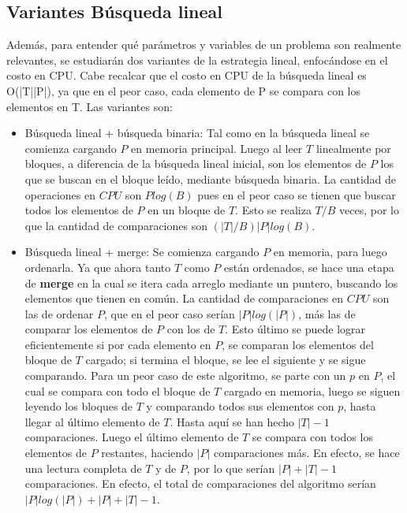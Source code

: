 \documentclass[11pt]{article}
\begin{document}
\subsection{Variantes Búsqueda lineal}
Además, para entender qué parámetros y variables de un problema son realmente relevantes, se estudiarán dos variantes de la estrategia lineal, enfocándose en el costo en CPU. Cabe recalcar que el costo en CPU de la búsqueda lineal es O(|T||P|), ya que en el peor caso, cada elemento de P se compara con los elementos en T. Las variantes son:
\begin{itemize}
    \item Búsqueda lineal + búsqueda binaria: Tal como en la búsqueda lineal se comienza cargando $P$ en memoria principal. Luego al leer $T$ linealmente por bloques, a diferencia de la búsqueda lineal inicial, son los elementos de $P$ los que se buscan en el bloque leído, mediante búsqueda binaria. La cantidad de operaciones en $CPU$ son $P log(B)$ pues en el peor caso se tienen que buscar todos los elementos de $P$ en un bloque de $T$. Esto se realiza $T/B$ veces, por lo que la cantidad de comparaciones son $(|T|/B) |P| log(B)$.
    
    \item Búsqueda lineal + merge: Se comienza cargando $P$ en memoria, para luego ordenarla. Ya que ahora tanto $T$ como $P$ están ordenados, se hace una etapa de \textbf{merge} en la cual se itera cada arreglo mediante un puntero, buscando los elementos que tienen en común. La cantidad de comparaciones en $CPU$ son las de ordenar $P$, que en el peor caso serían $|P|log(|P|)$, más las de comparar los elementos de $P$ con los de $T$. Esto último se puede lograr eficientemente si por cada elemento en $P$, se comparan los elementos del bloque de $T$ cargado; si termina el bloque, se lee el siguiente y se sigue comparando. Para un peor caso de este algoritmo, se parte con un $p$ en $P$, el cual se compara con todo el bloque de $T$ cargado en memoria, luego se siguen leyendo los bloques de $T$ y comparando todos sus elementos con $p$, hasta llegar al último elemento de $T$. Hasta aquí se han hecho $|T|-1$ comparaciones. Luego el último elemento de $T$ se compara con todos los elementos de $P$ restantes, haciendo $|P|$ comparaciones más. En efecto, se hace una lectura completa de $T$ y de $P$, por lo que serían $|P| + |T| -1$ comparaciones. En efecto, el total de comparaciones del algoritmo serían $|P|log(|P|) + |P| + |T| -1$.
\end{itemize}
\newpage
\end{document}
